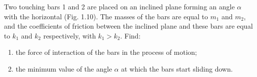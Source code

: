 \item Two touching bars 1 and 2 are placed on an inclined plane forming an angle \(\alpha\) with the horizontal (Fig. 1.10). The masses of the bars are equal to \(m_1\) and \(m_2\), and the coefficients of friction between the inclined plane and these bars are equal to \(k_1\) and \(k_2\) respectively, with \(k_1 > k_2\). Find:
    \begin{center}
    \end{center}
    \begin{enumerate}
        \item the force of interaction of the bars in the process of motion;
        \item the minimum value of the angle \(\alpha\) at which the bars start sliding down.
    \end{enumerate}


